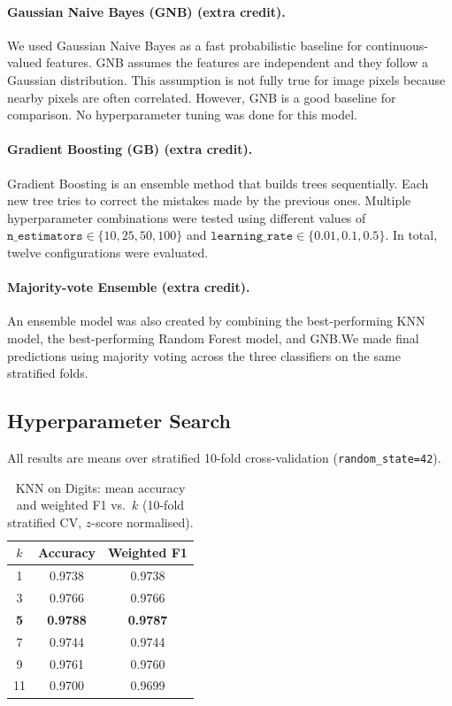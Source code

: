 \documentclass[11pt,letterpaper]{article}
\begin{document}
\paragraph{Gaussian Naive Bayes (GNB) (extra credit).}
We used Gaussian Naive Bayes as a fast probabilistic baseline for
continuous-valued features. GNB assumes the features are independent and they follow a Gaussian distribution. This assumption is not fully true for image pixels because nearby pixels are often correlated. However, GNB is a good baseline for
comparison. No hyperparameter tuning was done for this model.

\paragraph{Gradient Boosting (GB) (extra credit).}
Gradient Boosting is an ensemble method that builds trees sequentially. Each new tree tries to correct the mistakes made by the previous ones. Multiple
hyperparameter combinations were tested using different values of
$\texttt{n\_estimators} \in \{10,25,50,100\}$ and
$\texttt{learning\_rate} \in \{0.01,0.1,0.5\}$. In total, twelve
configurations were evaluated.

\paragraph{Majority-vote Ensemble (extra credit).}
An ensemble model was also created by combining the best-performing KNN
model, the best-performing Random Forest model, and GNB.We made final predictions using majority voting across the three classifiers on the same
stratified folds.

\subsection{Hyperparameter Search}

All results are means over stratified 10-fold cross-validation
(\texttt{random\_state=42}).

\begin{table}[H]
\centering
\caption{KNN on Digits: mean accuracy and weighted F1 vs.\ $k$
         (10-fold stratified CV, $z$-score normalised).}
\label{tab:d1_knn}
\begin{tabular}{@{}ccc@{}}
\toprule
$k$ & Accuracy & Weighted F1 \\
\midrule
1  & 0.9738 & 0.9738 \\
3  & 0.9766 & 0.9766 \\
\rowcolor{hilight}
\textbf{5}  & \textbf{0.9788} & \textbf{0.9787} \\
7  & 0.9744 & 0.9744 \\
9  & 0.9761 & 0.9760 \\
11 & 0.9700 & 0.9699 \\
\bottomrule
\end{tabular}
\end{table}
\end{document}
